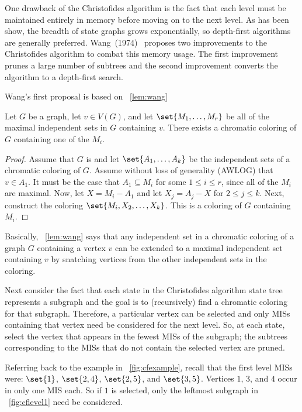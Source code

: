 One drawback of the Christofides algorithm is the fact that each level must be maintained entirely in memory before
moving on to the next level.  As has been show, the breadth of state graphs grows exponentially, so depth-first
algorithms are generally preferred.  Wang~(1974)~\cite{wang} proposes two improvements to the Christofides
algorithm to combat this memory usage.  The first improvement prunes a large number of subtrees and the second
improvement converts the algorithm to a depth-first search.

Wang's first proposal is based on \lemmaname~\ref{lem:wang}

\begin{lemma}
  \label{lem:wang}
  Let \(G\) be a graph, let \(v\in V(G)\), and let \(\set{M_1,\ldots,M_r}\) be all of the maximal independent sets
  in \(G\) containing \(v\).  There exists a chromatic coloring of \(G\) containing one of the \(M_i\).
\end{lemma}

\begin{proof}
  Assume that \(G\) is  and let \(\set{A_1,\ldots,A_k}\) be the independent sets of a chromatic
  coloring of \(G\).  Assume without loss of generality (AWLOG) that \(v\in A_1\).  It must be the case that
  \(A_1\subseteq M_i\) for some \(1\le i\le r\), since all of the \(M_i\) are maximal.  Now, let \(X=M_i-A_1\) and
  let \(X_j=A_j-X\) for \(2\le j\le k\).  Next, construct the coloring \(\set{M_i,X_2,\ldots,X_k}\).  This is a
   coloring of \(G\) containing \(M_i\).
\end{proof}

Basically, \lemmaname~\ref{lem:wang} says that any independent set in a chromatic coloring of a graph \(G\)
containing a vertex \(v\) can be extended to a maximal independent set containing \(v\) by snatching vertices from
the other independent sets in the coloring.

Next consider the fact that each state in the Christofides algorithm state tree represents a subgraph and the goal
is to (recursively) find a chromatic coloring for that subgraph.  Therefore, a particular vertex can be selected
and only MISs containing that vertex need be considered for the next level.  So, at each state, select the vertex
that appears in the fewest MISs of the subgraph; the subtrees corresponding to the MISs that do not contain the
selected vertex are pruned.

Referring back to the example in \figurename~\ref{fig:cfexample}, recall that the first level MISs were:
\(\set{1}\), \(\set{2,4}\), \(\set{2,5}\), and \(\set{3,5}\).  Vertices \(1\), \(3\), and \(4\) occur in only
one MIS each.  So if \(1\) is selected, only the leftmost subgraph in \figurename~\ref{fig:cflevel1} need be
considered.

